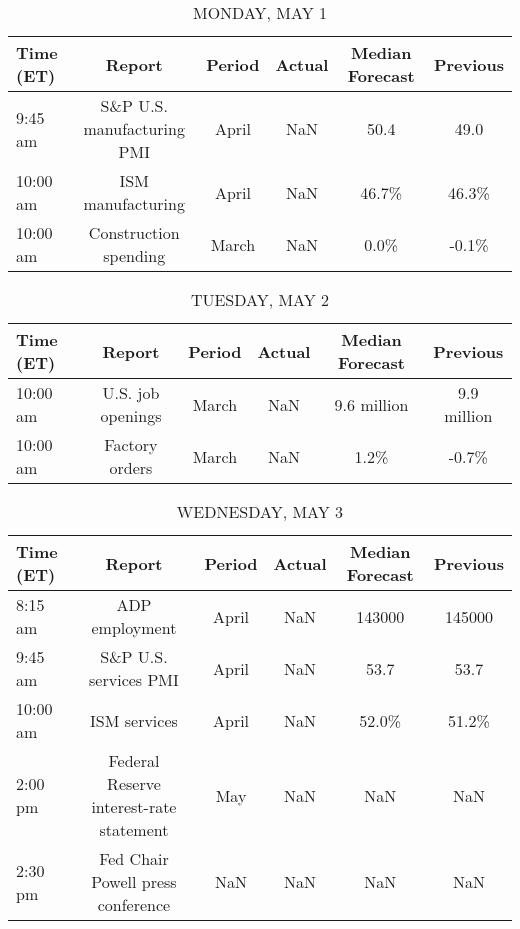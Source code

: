 \documentclass{article}%
\begin{document}
%
\normalsize%


\begin{table}[htbp]%
\caption{MONDAY, MAY 1}%
\centering%
\begin{adjustbox}{width=1\textwidth}%
\begin{tabular}{lccccc}
\toprule
Time (ET) &                     Report & Period & Actual & Median Forecast & Previous \\
\midrule
  9:45 am & S\&P U.S. manufacturing PMI &  April &    NaN &            50.4 &     49.0 \\
 10:00 am &          ISM manufacturing &  April &    NaN &           46.7\% &    46.3\% \\
 10:00 am &      Construction spending &  March &    NaN &            0.0\% &    -0.1\% \\
\bottomrule
\end{tabular}
%
\end{adjustbox}%
\end{table}

%


\begin{table}[htbp]%
\caption{TUESDAY, MAY 2}%
\centering%
\begin{adjustbox}{width=1\textwidth}%
\begin{tabular}{lccccc}
\toprule
Time (ET) &            Report & Period & Actual & Median Forecast &    Previous \\
\midrule
 10:00 am & U.S. job openings &  March &    NaN &     9.6 million & 9.9 million \\
 10:00 am &    Factory orders &  March &    NaN &            1.2\% &       -0.7\% \\
\bottomrule
\end{tabular}
%
\end{adjustbox}%
\end{table}

%


\begin{table}[htbp]%
\caption{WEDNESDAY, MAY 3}%
\centering%
\begin{adjustbox}{width=1\textwidth}%
\begin{tabular}{lccccc}
\toprule
Time (ET) &                                  Report & Period & Actual & Median Forecast & Previous \\
\midrule
  8:15 am &                          ADP employment &  April &    NaN &          143000 &   145000 \\
  9:45 am &                   S\&P U.S. services PMI &  April &    NaN &            53.7 &     53.7 \\
 10:00 am &                            ISM services &  April &    NaN &           52.0\% &    51.2\% \\
  2:00 pm & Federal Reserve interest-rate statement &    May &    NaN &             NaN &      NaN \\
  2:30 pm &       Fed Chair Powell press conference &    NaN &    NaN &             NaN &      NaN \\
\bottomrule
\end{tabular}
%
\end{adjustbox}%
\end{table}
\end{document}
